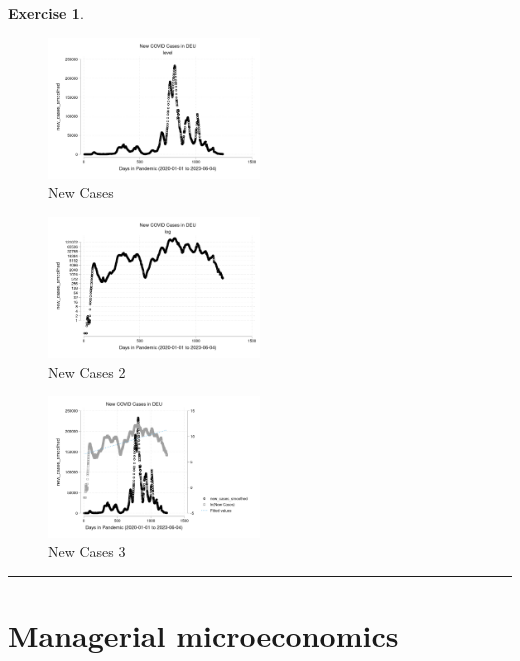 \documentclass[
  12pt,
  oneside]{book}
\theoremstyle{definition}
\theoremstyle{definition}
\theoremstyle{definition}
\newtheorem{exercise}{Exercise}[chapter]
\theoremstyle{definition}
\theoremstyle{remark}
\begin{document}
\begin{exercise}
\begin{figure}
\centering
\includegraphics[width=0.5\textwidth,height=\textheight]{fig/new.png}
\caption{New Cases}
\end{figure}

\begin{figure}
\centering
\includegraphics[width=0.5\textwidth,height=\textheight]{fig/new2.png}
\caption{New Cases 2}
\end{figure}

\begin{figure}
\centering
\includegraphics[width=0.5\textwidth,height=\textheight]{fig/new3.png}
\caption{New Cases 3}
\end{figure}

\begin{center}\rule{0.5\linewidth}{0.5pt}\end{center}

\end{exercise}

\hypertarget{managerial-microeconomics}{%
\chapter{Managerial microeconomics}\label{managerial-microeconomics}}
\end{document}
